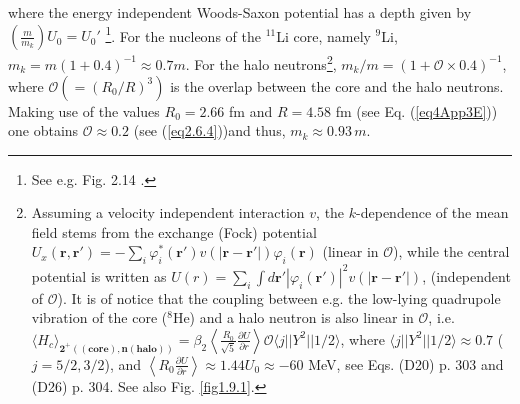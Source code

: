 where the energy independent Woods-Saxon potential has a depth given by\\\mbox{$\left(\frac{m}{m_k}\right)U_0=U_0'$} \footnote{See e.g. Fig. 2.14 \cite{Mahaux:85}.}. For the nucleons of the $^{11}$Li core, namely $^9$Li, $m_k=m(1+0.4)^{-1}\approx 0.7 m$. For the halo neutrons\footnote{\label{f117}Assuming a velocity independent interaction $v$, the $k$-dependence of the mean field stems from the exchange (Fock)  potential $U_x(\mathbf r, \mathbf r')=-\sum_i\varphi^*_i(\mathbf r')v(|\mathbf r-\mathbf r'|)\varphi_i(\mathbf r)$ (linear in $\mathcal O$), while the central potential is written as $U(r)=\sum_i\int d\mathbf r' |\varphi_i(\mathbf r')|^2v(|\mathbf r- \mathbf r'|)$, (independent of $\mathcal O$). It is of notice that the coupling between e.g. the low-lying  quadrupole vibration of the core ($^8$He) and a halo neutron is also linear in $\mathcal O$, i.e. $\langle H_c\rangle_{\pmb{2^+((\text{core}),n (\text{halo}))}}=\beta_2\left\langle\frac{R_0}{\sqrt{5}}\frac{\partial U}{\partial r}\right\rangle\mathcal O\langle j||Y^2||1/2\rangle$, where $\langle j||Y^2||1/2\rangle\approx0.7$ ($j=5/2,3/2$), and $\left\langle R_0\frac{\partial U}{\partial r}\right\rangle\approx1.44 U_0\approx -60$ MeV, see \cite{Brink:05} Eqs. (D20) p. 303 and (D26) p. 304. See also Fig. \ref{fig1.9.1}.}, $m_k/m=(1+\mathcal O\times0.4)^{-1}$, where $\mathcal O(=(R_0/R)^3)$ 
 is the overlap between the core and the halo neutrons. Making use of the values $R_0=2.66$ fm and $R=4.58$ fm (see Eq. (\ref{eq4App3E}))  one obtains $\mathcal O\approx0.2$ (see (\ref{eq2.6.4}))and thus,  $m_k\approx 0.93 \,m$.
